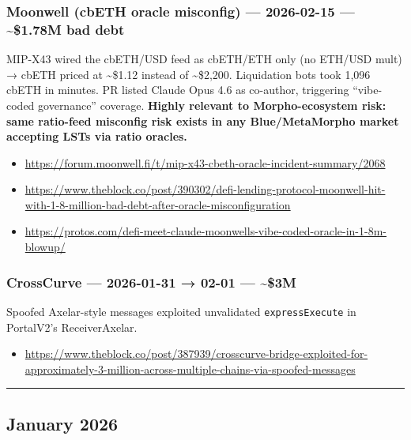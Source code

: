 \subsubsection{Moonwell (cbETH oracle misconfig) --- 2026-02-15 --- \textasciitilde\$1.78M bad debt}\label{moonwell-cbeth-oracle-misconfig-2026-02-15-1.78m-bad-debt}

MIP-X43 wired the cbETH/USD feed as cbETH/ETH only (no ETH/USD mult) → cbETH priced at \textasciitilde\$1.12 instead of \textasciitilde\$2,200. Liquidation bots took 1,096 cbETH in minutes. PR listed Claude Opus 4.6 as co-author, triggering ``vibe-coded governance'' coverage. \textbf{Highly relevant to Morpho-ecosystem risk: same ratio-feed misconfig risk exists in any Blue/MetaMorpho market accepting LSTs via ratio oracles.}

\begin{itemize}
\tightlist
\item
  \url{https://forum.moonwell.fi/t/mip-x43-cbeth-oracle-incident-summary/2068}
\item
  \url{https://www.theblock.co/post/390302/defi-lending-protocol-moonwell-hit-with-1-8-million-bad-debt-after-oracle-misconfiguration}
\item
  \url{https://protos.com/defi-meet-claude-moonwells-vibe-coded-oracle-in-1-8m-blowup/}
\end{itemize}

\subsubsection{CrossCurve --- 2026-01-31 → 02-01 --- \textasciitilde\$3M}\label{crosscurve-2026-01-31-02-01-3m}

Spoofed Axelar-style messages exploited unvalidated \texttt{expressExecute} in PortalV2's ReceiverAxelar.

\begin{itemize}
\tightlist
\item
  \url{https://www.theblock.co/post/387939/crosscurve-bridge-exploited-for-approximately-3-million-across-multiple-chains-via-spoofed-messages}
\end{itemize}

\begin{center}\rule{0.5\linewidth}{0.5pt}\end{center}

\subsection{January 2026}\label{january-2026}

